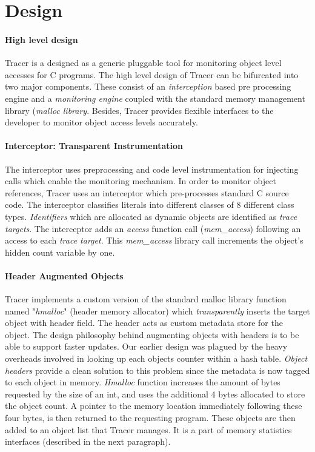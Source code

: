 \section{Design}
\label{sec:design}
\paragraph{High level design}
Tracer is a designed as a generic pluggable tool for monitoring object level accesses for C programs. The high level design of Tracer can be bifurcated into two major components. These consist of an {\emph{interception}} based pre processing engine and a {\emph{monitoring engine}} coupled with the standard memory management library ({\emph{malloc library}}. Besides, Tracer provides flexible interfaces to the developer to monitor object access levels accurately. 
\paragraph{Interceptor: Transparent Instrumentation}
The interceptor uses preprocessing and code level instrumentation for injecting calls which enable the monitoring mechanism. In order to monitor object references, Tracer uses an interceptor which pre-processes standard C source code. The interceptor classifies literals into different classes of 8 different class types. {\emph{Identifiers}} which are allocated as dynamic objects are identified as {\emph{trace targets}}.  The interceptor adds an {\emph{access}} function call ({\emph{mem\_access}}) following an access to each {\emph{trace target}}. This {\emph{mem\_access}} library call increments the object's hidden count variable by one. 
\paragraph{Header Augmented Objects}
Tracer implements a custom version of the standard malloc library function named "{\emph{hmalloc}}" (header memory allocator) which {\emph{transparently}} inserts the target object with header field. The header acts as custom metadata store for the object. The design philosophy behind augmenting objects with headers is to be able to support faster updates. Our earlier design was plagued by the heavy overheads involved in looking up each objects counter within a hash table. {\emph{Object headers}} provide a clean solution to this problem since the metadata is now tagged to each object in memory. {\emph{Hmalloc}} function increases the amount of bytes requested by the size of an int, and uses the additional 4 bytes allocated to store the object count. A pointer to the memory location immediately following these four bytes, is then returned to the requesting program. These objects are then added to an object list that Tracer manages. It is a part of memory statistics interfaces (described in the next paragraph).
